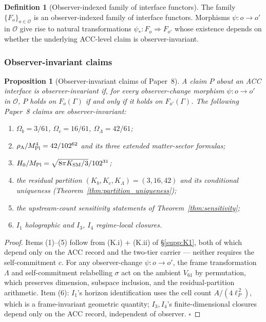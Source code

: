 \documentclass[11pt]{article}
\theoremstyle{plain}
\newtheorem{proposition}[theorem]{Proposition}
\theoremstyle{definition}
\newtheorem{definition}[theorem]{Definition}
\theoremstyle{remark}
\newcommand{\Mpl}{M_{\rm Pl}}
\begin{document}
\begin{definition}[Observer-indexed family of interface functors]\label{def:observer_family}
The family $\{F_o\}_{o \in \mathcal{O}}$ is an observer-indexed family of interface functors.  Morphisms $\psi : o \to o'$ in $\mathcal{O}$ give rise to natural transformations $\psi_* : F_o \Rightarrow F_{o'}$ whose existence depends on whether the underlying ACC-level claim is observer-invariant.
\end{definition}

\subsubsection*{Observer-invariant claims}

\begin{proposition}[Observer-invariant claims of Paper~8]\label{prop:observer_invariant}
A claim $P$ about an ACC interface is \emph{observer-invariant} if, for every observer-change morphism $\psi : o \to o'$ in $\mathcal{O}$, $P$ holds on $F_o(\Gamma)$ if and only if it holds on $F_{o'}(\Gamma)$.  The following Paper~8 claims are observer-invariant:
\begin{enumerate}[leftmargin=2.5em,label=(\arabic*),itemsep=3pt]
  \item $\Omega_b = 3/61$, $\Omega_c = 16/61$, $\Omega_\Lambda = 42/61$;
  \item $\rho_\Lambda / \Mpl^4 = 42/102^{62}$ and its three extended matter-sector formulas;
  \item $H_0 / \Mpl = \sqrt{8\pi K_{\rm SM}/3} / 102^{31}$;
  \item the residual partition $(K_b, K_c, K_\Lambda) = (3, 16, 42)$ and its conditional uniqueness (Theorem~\ref{thm:partition_uniqueness});
  \item the upstream-count sensitivity statements of Theorem~\ref{thm:sensitivity};
  \item $I_1$ holographic and $I_3$, $I_4$ regime-local closures.
\end{enumerate}
\end{proposition}

\begin{proof}
Items (1)--(5) follow from (K.i) + (K.ii) of \S\ref{supp:K1}, both of which depend only on the ACC record and the two-tier carrier --- neither requires the self-commitment $c$.  For any observer-change $\psi : o \to o'$, the frame transformation $\Lambda$ and self-commitment relabelling $\sigma$ act on the ambient $V_{61}$ by permutation, which preserves dimension, subspace inclusion, and the residual-partition arithmetic.  Item (6): $I_1$'s horizon identification uses the cell count $A/(4\ell_P^{\,2})$, which is a frame-invariant geometric quantity; $I_3, I_4$'s finite-dimensional closures depend only on the ACC record, independent of observer.  $\square$
\end{proof}
\end{document}
